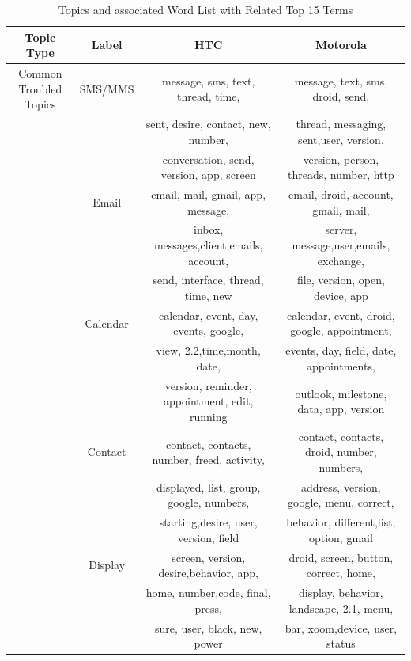 \documentclass[10pt, conference, compsocconf]{IEEEtran}
\begin{document}
\begin{table}[!htb]
\renewcommand{\arraystretch}{1.3}
\caption{Topics and associated Word List with Related Top 15 Terms}
\label{topicslist}
\centering
\begin{tabular}{|c||c||c||c|}
\hline
Topic Type & Label & HTC & Motorola\\ 
\hline
Common Troubled Topics & SMS\//MMS &message,	sms,	text, thread, time,  & message, text, sms, droid, send,	\\
&& sent, desire, contact, new, number, &	thread, messaging, sent,user, version,\\ 
&&conversation, send, version, app, screen &version, person, threads, number, http\\ \cline{2-4}

  & Email & email, mail, gmail, app, message,   &email, droid, account,	gmail, mail, \\
&&inbox, messages,client,emails, account,  &server, message,user,emails, exchange, \\ 
&&send, interface, thread, time, new & file, version, open, device, app\\ \cline{2-4}
            
& Calendar&calendar, event, day, events, google,  &calendar,	event, droid, google, appointment, \\
&&view, 2.2,time,month, date, &events, day, field, date, appointments, \\ 
&&version, reminder, appointment,  edit, running &outlook, milestone, data, app, version\\ \cline{2-4}
            
& Contact & contact, contacts, number, freed, activity,  &contact, contacts, droid, number, numbers, \\
&&displayed, list, group, google, numbers,   &address, version, google, menu, correct, \\
&&starting,desire, user, version, field & behavior, different,list, option, gmail\\ \cline{2-4}
            
  & Display&screen, version, desire,behavior, app, &droid, screen, button, correct, home, \\
&& home, number,code, final, press,  &display, behavior,  landscape, 2.1,  menu, \\
&&sure, user, black, new, power  &bar, xoom,device, user, status\\ \cline{2-4}
   

\end{tabular}
\end{table}
\end{document}
